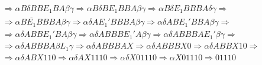 \begin{ejercicio}
\begin{enumerate}
\begin{description}
\begin{align*}
                      &\Rightarrow \alpha B \delta BB E_1 BA \beta \gamma \Rightarrow \alpha B \delta B E_1 BBA \beta \gamma \Rightarrow \alpha B \delta E_1 BBBA \delta \gamma \Rightarrow \\
                      &\Rightarrow \alpha B \overline{E_1} BBBA \beta \gamma \Rightarrow \alpha \delta A E_1' BBBA \beta \gamma \Rightarrow \alpha \delta AB E_1' BBA \beta \gamma \Rightarrow \\
                      &\Rightarrow \alpha \delta ABB E_1' BA \beta \gamma \Rightarrow \alpha \delta ABBB E_1' A \beta \gamma \Rightarrow \alpha \delta ABBBA E_1' \beta \gamma \Rightarrow \\
                      &\Rightarrow \alpha \delta ABBBA \beta L_1 \gamma \Rightarrow \alpha \delta ABBBA X \Rightarrow \alpha \delta ABBBX0 \Rightarrow \alpha \delta ABBX10 \Rightarrow \\
                      &\Rightarrow \alpha \delta ABX110 \Rightarrow \alpha \delta AX1110 \Rightarrow \alpha \delta X01110 \Rightarrow \alpha X 01110 \Rightarrow 01110
                \end{align*}
            \end{description}
    \end{enumerate}
\end{ejercicio}


